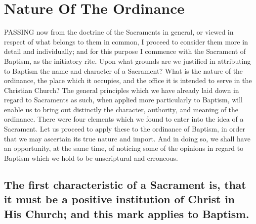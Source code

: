 \documentclass[]{book}
\begin{document}
\hypertarget{nature-of-the-ordinance}{%
\section{Nature Of The Ordinance}\label{nature-of-the-ordinance}}

PASSING now from the doctrine of the Sacraments in general, or viewed in respect of what belongs to them in common, I proceed to consider them more in detail and individually; and for this purpose I commence with the Sacrament of Baptism, as the initiatory rite. Upon what grounds are we justified in attributing to Baptism the name and character of a Sacrament? What is the nature of the ordinance, the place which it occupies, and the office it is intended to serve in the Christian Church? The general principles which we have already laid down in regard to Sacraments as such, when applied more particularly to Baptism, will enable us to bring out distinctly the character, authority, and meaning of the ordinance. There were four elements which we found to enter into the idea of a Sacrament. Let us proceed to apply these to the ordinance of Baptism, in order that we may ascertain its true nature and import. And in doing so, we shall have an opportunity, at the same time, of noticing some of the opinions in regard to Baptism which we hold to be unscriptural and erroneous.

\hypertarget{the-first-characteristic-of-a-sacrament-is-that-it-must-be-a-positive-institution-of-christ-in-his-church-and-this-mark-applies-to-baptism.}{%
\subsection{The first characteristic of a Sacrament is, that it must be a positive institution of Christ in His Church; and this mark applies to Baptism.}\label{the-first-characteristic-of-a-sacrament-is-that-it-must-be-a-positive-institution-of-christ-in-his-church-and-this-mark-applies-to-baptism.}}
\end{document}
